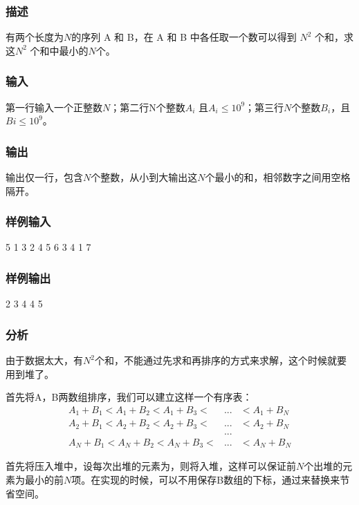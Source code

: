 \subsubsection{描述}
有两个长度为$N$的序列 A 和 B，在 A 和 B 中各任取一个数可以得到 $N^2$ 个和，求这$N^2$ 个和中最小的$N$个。

\subsubsection{输入}
第一行输入一个正整数$N$；第二行N个整数$A_i$ 且$A_i \leq 10^9$；第三行$N$个整数$B_i$，且$Bi \leq 10^9$。

\subsubsection{输出}
输出仅一行，包含$N$个整数，从小到大输出这$N$个最小的和，相邻数字之间用空格隔开。

\subsubsection{样例输入}
\begin{Code}
5
1 3 2 4 5 
6 3 4 1 7
\end{Code}

\subsubsection{样例输出}
\begin{Code}
2 3 4 4 5
\end{Code}

\subsubsection{分析}
由于数据太大，有$N^2$个和，不能通过先求和再排序的方式来求解，这个时候就要用到堆了。

首先将A，B两数组排序，我们可以建立这样一个有序表：
\begin{eqnarray}
A_1+B_1<A_1+B_2<A_1+B_3< &...& <A_1+B_N \nonumber \\
A_2+B_1<A_2+B_2<A_2+B_3< &...& <A_2+B_N \nonumber \\
& ...  \nonumber \\
A_N+B_1<A_N+B_2<A_N+B_3< &...& <A_N+B_N \nonumber
\end{eqnarray}

首先将压入堆中，设每次出堆的元素为，则将入堆，这样可以保证前$N$个出堆的元素为最小的前$N$项。在实现的时候，可以不用保存B数组的下标，通过来替换来节省空间。

